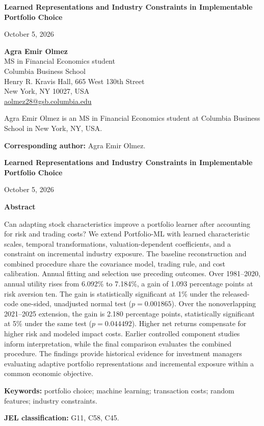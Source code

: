 \documentclass[12pt,letterpaper,fleqn]{article}
\newcommand{\papertitle}{Learned Representations and Industry Constraints in Implementable Portfolio Choice}
\newcommand{\paperdate}{October 5, 2026}
\newcommand{\printtitle}{\begingroup\setlength{\parindent}{0pt}\raggedright
{\fontsize{18}{22}\selectfont\bfseries\papertitle\par}\endgroup}
\renewenvironment{abstract}{\begingroup\setlength{\parindent}{0pt}\noindent\textbf{Abstract}\par}{\par\endgroup}
\begin{document}
\printtitle
\noindent\paperdate\par

\vspace{18pt}
\noindent\textbf{Agra Emir Olmez}\\
MS in Financial Economics student\\
Columbia Business School\\
Henry R. Kravis Hall, 665 West 130th Street\\
New York, NY 10027, USA\\
\href{mailto:aolmez28@gsb.columbia.edu}{aolmez28@gsb.columbia.edu}

\noindent Agra Emir Olmez is an MS in Financial Economics student at Columbia Business School in New York, NY, USA.

\noindent\textbf{Corresponding author:} Agra Emir Olmez.
\clearpage
\printtitle
\noindent\paperdate\par
\begin{abstract}
Can adapting stock characteristics improve a portfolio learner after accounting for risk and trading costs? We extend Portfolio-ML with learned characteristic scales, temporal transformations, valuation-dependent coefficients, and a constraint on incremental industry exposure. The baseline reconstruction and combined procedure share the covariance model, trading rule, and cost calibration. Annual fitting and selection use preceding outcomes. Over 1981--2020, annual utility rises from 6.092\% to 7.184\%, a gain of 1.093 percentage points at risk aversion ten. The gain is statistically significant at 1\% under the released-code one-sided, unadjusted normal test ($p=0.001865$). Over the nonoverlapping 2021--2025 extension, the gain is 2.180 percentage points, statistically significant at 5\% under the same test ($p=0.044492$). Higher net returns compensate for higher risk and modeled impact costs. Earlier controlled component studies inform interpretation, while the final comparison evaluates the combined procedure. The findings provide historical evidence for investment managers evaluating adaptive portfolio representations and incremental exposure within a common economic objective.
\end{abstract}
\noindent\textbf{Keywords:} portfolio choice; machine learning; transaction costs; random features; industry constraints.

\noindent\textbf{JEL classification:} G11, C58, C45.
\end{document}
